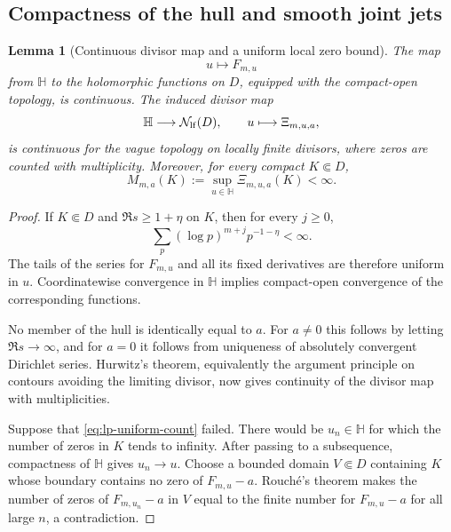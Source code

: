 \documentclass[11pt]{article}
\newtheorem{lemma}[theorem]{Lemma}
\theoremstyle{definition}
\theoremstyle{remark}
\begin{document}
\subsection{Compactness of the hull and smooth joint jets}

\begin{lemma}[Continuous divisor map and a uniform local zero bound]
\label{lem:lp-compact-divisor}
The map
\[
 u\longmapsto F_{m,u}
\]
from $\mathbb H$ to the holomorphic functions on $D$, equipped with the
compact-open topology, is continuous.  The induced divisor map
\begin{equation}
 \mathbb H\longrightarrow\mathcal N_{\rm lf}(D),
 \qquad u\longmapsto\Xi_{m,u,a},
 \label{eq:lp-divisor-map}
\end{equation}
is continuous for the vague topology on locally finite divisors, where zeros
are counted with multiplicity.  Moreover, for every compact $K\Subset D$,
\begin{equation}
 M_{m,a}(K):=\sup_{u\in\mathbb H}\Xi_{m,u,a}(K)<\infty.
 \label{eq:lp-uniform-count}
\end{equation}
\end{lemma}

\begin{proof}
If $K\Subset D$ and $\Re s\geq1+\eta$ on $K$, then for every $j\geq0$,
\[
 \sum_p(\log p)^{m+j}p^{-1-\eta}<\infty.
\]
The tails of the series for $F_{m,u}$ and all its fixed derivatives are
therefore uniform in $u$.  Coordinatewise convergence in $\mathbb H$ implies
compact-open convergence of the corresponding functions.

No member of the hull is identically equal to $a$.  For $a\neq0$ this follows
by letting $\Re s\to\infty$, and for $a=0$ it follows from uniqueness of
absolutely convergent Dirichlet series.  Hurwitz's theorem, equivalently the
argument principle on contours avoiding the limiting divisor, now gives
continuity of the divisor map with multiplicities.

Suppose that \eqref{eq:lp-uniform-count} failed.  There would be $u_n\in
\mathbb H$ for which the number of zeros in $K$ tends to infinity.  After
passing to a subsequence, compactness of $\mathbb H$ gives $u_n\to u$.  Choose
a bounded domain $V\Subset D$ containing $K$ whose boundary contains no zero
of $F_{m,u}-a$.  Rouch\'e's theorem makes the number of zeros of
$F_{m,u_n}-a$ in $V$ equal to the finite number for $F_{m,u}-a$ for all large
$n$, a contradiction.
\end{proof}
\end{document}
